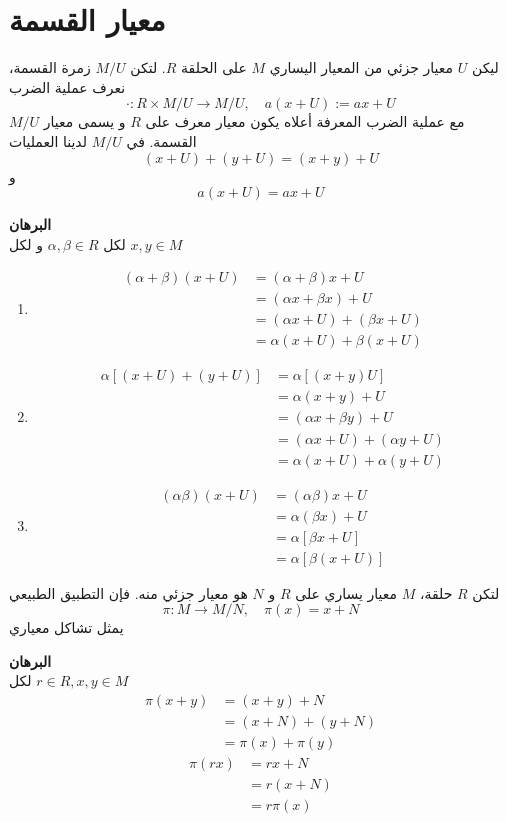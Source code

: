 \section{معيار القسمة}
\begin{theorem}
	ليكن $U$ معيار جزئي من المعيار اليساري $M$ على الحلقة $R$. لتكن $M/U$ زمرة القسمة، نعرف عملية الضرب
	\[
	\cdot : R \times M/U \to M/U, \quad a(x+U):= ax + U
	\]
	$M/U$ مع عملية الضرب المعرفة أعلاه يكون معيار معرف على $R$ و يسمى معيار القسمة. في $M/U$ لدينا العمليات
	\[
	(x+U) + (y+U) = (x+y) + U
	\]
	و 
	\[
	a(x+U) = ax+U
	\]
\end{theorem}
\noindent
\textbf{البرهان}\\
\noindent
لكل $\alpha,\beta\in R$ و لكل $x,y\in M$
\begin{enumerate}
	\item 
	\begin{align*}
		(\alpha+\beta)(x+U) &= (\alpha+\beta)x+U\\
		&= (\alpha x+ \beta x) + U\\
		&= (\alpha x + U) + (\beta x + U) \\
		&= \alpha (x+U) + \beta (x+U)
	\end{align*}
	\item 
	\begin{align*}
		\alpha [(x+U)+(y+U)] &= \alpha [(x+y)U]\\
		&= \alpha(x+y) + U\\
		&= (\alpha x+ \beta y) + U\\
		&= (\alpha x + U) + (\alpha y+U) \\
		& = \alpha (x+U) + \alpha (y+U)
	\end{align*}
	\item 
	\begin{align*}
		(\alpha \beta ) (x+U) &= (\alpha \beta )x + U\\
		&= \alpha (\beta x) + U\\
		&= \alpha [\beta x+U]\\
		&= \alpha[\beta (x+U)]
	\end{align*}
\end{enumerate}
\begin{theorem}
	لتكن $R$ حلقة، $M$ معيار يساري على $R$ و $N$ هو معيار جزئي منه. فإن التطبيق الطبيعي
	\[
	\pi:M \to M/N, \quad \pi(x) = x+N
	\]
	يمثل تشاكل معياري
\end{theorem}
\noindent
\textbf{البرهان}\\
\noindent
لكل $r\in R, x, y\in M$
	\begin{align*}
		\pi(x+y) &= (x+y) + N\\
		&= (x+N) + (y+N)\\
		&= \pi(x) + \pi(y) 
	\end{align*}
\begin{align*}
	\pi(rx) &= rx + N\\
	&= r(x+N)\\
	&= r \pi(x)
\end{align*}

